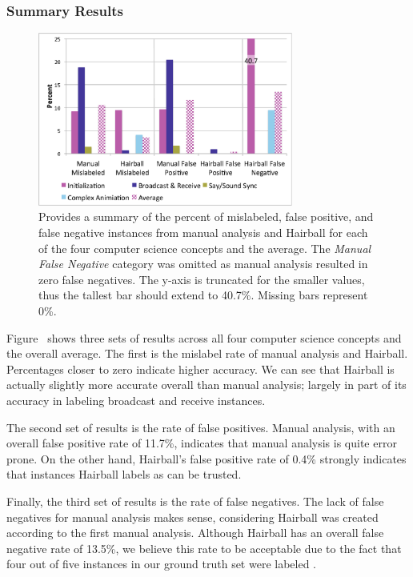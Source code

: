 \subsubsection{Summary Results}
\begin{figure}[!t]
\centering \includegraphics[trim=.3in .15in .3in .15in, clip,
  width=3.3in]{graphs/AutoSummary.eps}
\caption{Provides a summary of the percent of mislabeled, false positive, and
  false negative instances from manual analysis and Hairball for each of the
  four computer science concepts and the average. The \emph{Manual False
    Negative} category was omitted as manual analysis resulted in zero false
  negatives. The y-axis is truncated for the smaller values, thus the tallest
  bar should extend to 40.7\%. Missing bars represent 0\%.}
\end{figure}

Figure~ shows three sets of results across all four
computer science concepts and the overall average. The first is the mislabel
rate of manual analysis and Hairball. Percentages closer to zero indicate
higher accuracy. We can see that Hairball is actually slightly more accurate
overall than manual analysis; largely in part of its accuracy in labeling
broadcast and receive instances.

The second set of results is the rate of false positives. Manual analysis, with
an overall false positive rate of 11.7\%, indicates that manual analysis is
quite error prone. On the other hand, Hairball's false positive rate of 0.4\%
strongly indicates that instances Hairball labels as \correct{} can be trusted.

Finally, the third set of results is the rate of false negatives. The lack of
false negatives for manual analysis makes sense, considering Hairball was
created according to the first manual analysis. Although Hairball has an
overall false negative rate of 13.5\%, we believe this rate to be acceptable
due to the fact that four out of five instances in our ground truth set were
labeled \correct{}.
